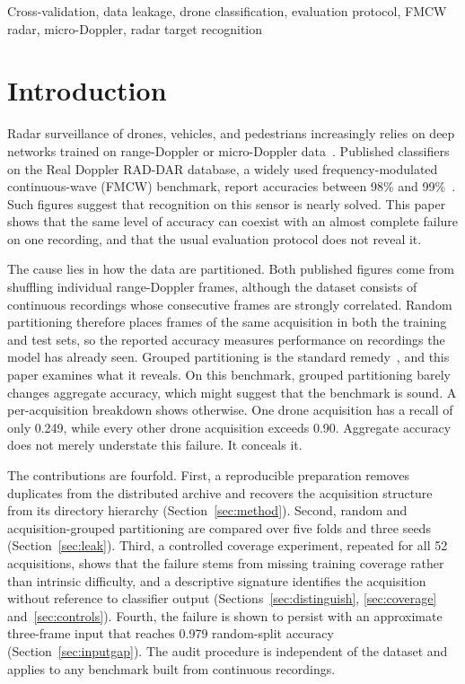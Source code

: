 \documentclass[conference]{IEEEtran}
\begin{document}
\begin{IEEEkeywords}
Cross-validation, data leakage, drone classification, evaluation protocol, FMCW radar, micro-Doppler, radar target recognition
\end{IEEEkeywords}

\section{Introduction}

Radar surveillance of drones, vehicles, and pedestrians increasingly relies on deep networks trained on range-Doppler or micro-Doppler data~\cite{ahmad2024,liaquat2025imm,mustafa2026}. Published classifiers on the Real Doppler RAD-DAR database, a widely used frequency-modulated continuous-wave (FMCW) benchmark, report accuracies between 98\% and 99\%~\cite{roldan2020,zhang2025}. Such figures suggest that recognition on this sensor is nearly solved. This paper shows that the same level of accuracy can coexist with an almost complete failure on one recording, and that the usual evaluation protocol does not reveal it.

The cause lies in how the data are partitioned. Both published figures come from shuffling individual range-Doppler frames, although the dataset consists of continuous recordings whose consecutive frames are strongly correlated. Random partitioning therefore places frames of the same acquisition in both the training and test sets, so the reported accuracy measures performance on recordings the model has already seen. Grouped partitioning is the standard remedy~\cite{kapoor2023,buchman2022}, and this paper examines what it reveals. On this benchmark, grouped partitioning barely changes aggregate accuracy, which might suggest that the benchmark is sound. A per-acquisition breakdown shows otherwise. One drone acquisition has a recall of only 0.249, while every other drone acquisition exceeds 0.90. Aggregate accuracy does not merely understate this failure. It conceals it.

The contributions are fourfold. First, a reproducible preparation removes duplicates from the distributed archive and recovers the acquisition structure from its directory hierarchy (Section~\ref{sec:method}). Second, random and acquisition-grouped partitioning are compared over five folds and three seeds (Section~\ref{sec:leak}). Third, a controlled coverage experiment, repeated for all 52 acquisitions, shows that the failure stems from missing training coverage rather than intrinsic difficulty, and a descriptive signature identifies the acquisition without reference to classifier output (Sections~\ref{sec:distinguish}, \ref{sec:coverage} and~\ref{sec:controls}). Fourth, the failure is shown to persist with an approximate three-frame input that reaches 0.979 random-split accuracy (Section~\ref{sec:inputgap}). The audit procedure is independent of the dataset and applies to any benchmark built from continuous recordings.
\end{document}
